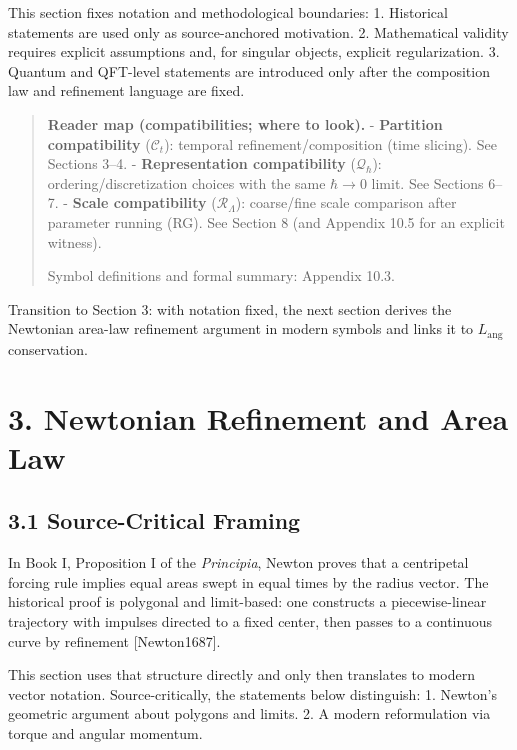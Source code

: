 \documentclass[
]{article}
\begin{document}
This section fixes notation and methodological boundaries: 1. Historical
statements are used only as source-anchored motivation. 2. Mathematical
validity requires explicit assumptions and, for singular objects,
explicit regularization. 3. Quantum and QFT-level statements are
introduced only after the composition law and refinement language are
fixed.

\begin{quote}
\textbf{Reader map (compatibilities; where to look).} -
\textbf{Partition compatibility} (\(\mathcal C_t\)): temporal
refinement/composition (time slicing). See Sections 3--4. -
\textbf{Representation compatibility} (\(\mathcal Q_\hbar\)):
ordering/discretization choices with the same \(\hbar\to0\) limit. See
Sections 6--7. - \textbf{Scale compatibility} (\(\mathcal R_\Lambda\)):
coarse/fine scale comparison after parameter running (RG). See Section 8
(and Appendix 10.5 for an explicit witness).

Symbol definitions and formal summary: Appendix 10.3.
\end{quote}

Transition to Section 3: with notation fixed, the next section derives
the Newtonian area-law refinement argument in modern symbols and links
it to \(L_{\mathrm{ang}}\) conservation.

\hypertarget{newtonian-refinement-and-area-law}{%
\section{3. Newtonian Refinement and Area
Law}\label{newtonian-refinement-and-area-law}}

\hypertarget{source-critical-framing}{%
\subsection{3.1 Source-Critical Framing}\label{source-critical-framing}}

In Book I, Proposition I of the \emph{Principia}, Newton proves that a
centripetal forcing rule implies equal areas swept in equal times by the
radius vector. The historical proof is polygonal and limit-based: one
constructs a piecewise-linear trajectory with impulses directed to a
fixed center, then passes to a continuous curve by refinement
{[}Newton1687{]}.

This section uses that structure directly and only then translates to
modern vector notation. Source-critically, the statements below
distinguish: 1. Newton's geometric argument about polygons and limits.
2. A modern reformulation via torque and angular momentum.
\end{document}
